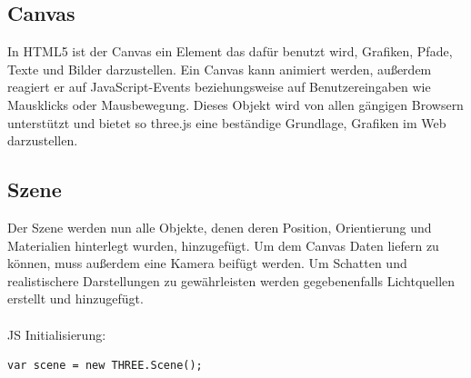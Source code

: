 \subsection*{Canvas}
In HTML5 ist der Canvas ein Element das dafür benutzt wird, Grafiken, Pfade, Texte und Bilder darzustellen. Ein Canvas kann animiert werden, außerdem reagiert er auf JavaScript-Events beziehungsweise auf Benutzereingaben wie Mausklicks oder Mausbewegung. Dieses Objekt wird von allen gängigen Browsern unterstützt und bietet so three.js eine beständige Grundlage, Grafiken im Web darzustellen. \cite{w3canvas}

\subsection*{Szene}
Der Szene werden nun alle Objekte, denen deren Position, Orientierung und Materialien hinterlegt wurden, hinzugefügt. Um dem Canvas Daten liefern zu können, muss außerdem eine Kamera beifügt werden. Um Schatten und realistischere Darstellungen zu gewährleisten werden gegebenenfalls Lichtquellen erstellt und hinzugefügt. 
\cite{Szenengraph}
\\
\\
JS Initialisierung:
\begin{verbatim}
var scene = new THREE.Scene();
\end{verbatim}
\newpage
\clearpage
